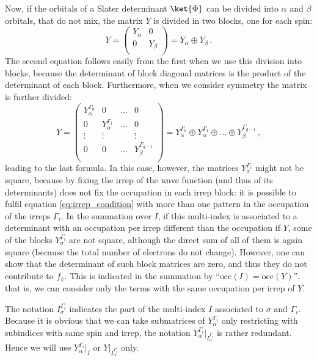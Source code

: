 \documentclass[a4paper,11pt]{article}
\begin{document}
Now, if the orbitals of a Slater determinant $\ket{\Phi}$ can be divided into $\alpha$ and $\beta$ orbitals, that do not mix, the matrix $Y$ is divided in two blocks, one for each spin:
\begin{equation}
  Y =
  \begin{pmatrix}
    Y_\alpha & 0\\
    0 & Y_\beta\\
  \end{pmatrix}
  = Y_\alpha \oplus Y_\beta\,.
\end{equation}
The second equation follows easily from the first when we use this division into blocks, because the determinant of block diagonal matrices is the product of the determinant of each block.
Furthermore, when we consider symmetry the matrix is further divided:
\begin{equation}\label{eq:Y_spin_irrep_blocks}
  Y =
  \begin{pmatrix}
    Y_\alpha^{\Gamma_0} & 0 & ... & 0\\
    0 & Y_\alpha^{\Gamma_1} & ... & 0 \\
    \vdots & \vdots & & \vdots\\
    0 & 0 &\dots & Y_\beta^{\Gamma_{g-1}}\\
  \end{pmatrix}
  = Y_\alpha^{\Gamma_0} \oplus Y_\alpha^{\Gamma_1} \oplus \dots \oplus Y_\beta^{\Gamma_{g-1}}\,,
\end{equation}
leading to the last formula.
In this case, however, the matrices $Y_\sigma^{\Gamma_i}$ might not be square, because by fixing the irrep of the wave function (and thus of its determinants) does not fix the occupation in each irrep block:
it is possible to fulfil equation \ref{eq:irrep_condition} with more than one pattern in the occupation of the irreps $\Gamma_i$.
In the summation over $I$, if this multi-index is associated to a determinant with an occupation per irrep different than the occupation if $Y$, some of the blocks $Y_\sigma^{\Gamma_i}$ are not square, although the direct sum of all of them is again square (because the total number of electrons do not change).
However, one can show that the determinant of such block matrices are zero, and thus they do not contribute to $f_\lozenge$.
This is indicated in the summation by ``$\text{occ}(I) = \text{occ}(Y)$'', that is, we can consider only the terms with the same occupation per irrep of $Y$.

The notation $I_\sigma^{\Gamma_i}$ indicates the part of the multi-index $I$ associated to $\sigma$ and $\Gamma_i$.
Because it is obvious that we can take submatrices of $Y_\alpha^{\Gamma_i}$ only restricting with subindices with same spin and irrep, the notation $Y_\alpha^{\Gamma_i}\big|_{I_\alpha^{\Gamma_i}}$ is rather redundant.
Hence we will use $Y_\alpha^{\Gamma_i}\big|_{I}$ or $Y\big|_{I_\alpha^{\Gamma_i}}$ only.
\end{document}
